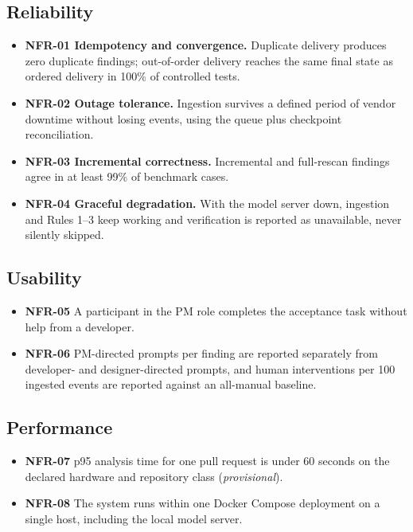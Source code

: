 \subsection{Reliability}
\begin{itemize}
  \item \textbf{NFR-01 Idempotency and convergence.} Duplicate delivery
        produces zero duplicate findings; out-of-order delivery reaches the same
        final state as ordered delivery in 100\% of controlled tests.
  \item \textbf{NFR-02 Outage tolerance.} Ingestion survives a defined period of
        vendor downtime without losing events, using the queue plus checkpoint
        reconciliation.
  \item \textbf{NFR-03 Incremental correctness.} Incremental and full-rescan
        findings agree in at least 99\% of benchmark cases.
  \item \textbf{NFR-04 Graceful degradation.} With the model server down,
        ingestion and Rules 1--3 keep working and verification is reported as
        unavailable, never silently skipped.
\end{itemize}

\subsection{Usability}
\begin{itemize}
  \item \textbf{NFR-05} A participant in the PM role completes the acceptance
        task without help from a developer.
  \item \textbf{NFR-06} PM-directed prompts per finding are reported separately
        from developer- and designer-directed prompts, and human interventions
        per 100 ingested events are reported against an all-manual baseline.
\end{itemize}

\subsection{Performance}
\begin{itemize}
  \item \textbf{NFR-07} p95 analysis time for one pull request is under 60
        seconds on the declared hardware and repository class
        (\emph{provisional}).
  \item \textbf{NFR-08} The system runs within one Docker Compose deployment on a
        single host, including the local model server.
\end{itemize}

